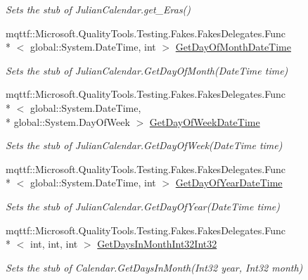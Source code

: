 \begin{DoxyCompactItemize}
\begin{DoxyCompactList}\small\item\em Sets the stub of Julian\-Calendar.\-get\-\_\-\-Eras()\end{DoxyCompactList}\item 
mqttf\-::\-Microsoft.\-Quality\-Tools.\-Testing.\-Fakes.\-Fakes\-Delegates.\-Func\\*
$<$ global\-::\-System.\-Date\-Time, int $>$ \hyperlink{class_system_1_1_globalization_1_1_fakes_1_1_stub_julian_calendar_a74f8b04f919d5bd98d2880a0bebac470}{Get\-Day\-Of\-Month\-Date\-Time}
\begin{DoxyCompactList}\small\item\em Sets the stub of Julian\-Calendar.\-Get\-Day\-Of\-Month(\-Date\-Time time)\end{DoxyCompactList}\item 
mqttf\-::\-Microsoft.\-Quality\-Tools.\-Testing.\-Fakes.\-Fakes\-Delegates.\-Func\\*
$<$ global\-::\-System.\-Date\-Time, \\*
global\-::\-System.\-Day\-Of\-Week $>$ \hyperlink{class_system_1_1_globalization_1_1_fakes_1_1_stub_julian_calendar_a6789f7bd712a9c2485cc8df1e5c92caa}{Get\-Day\-Of\-Week\-Date\-Time}
\begin{DoxyCompactList}\small\item\em Sets the stub of Julian\-Calendar.\-Get\-Day\-Of\-Week(\-Date\-Time time)\end{DoxyCompactList}\item 
mqttf\-::\-Microsoft.\-Quality\-Tools.\-Testing.\-Fakes.\-Fakes\-Delegates.\-Func\\*
$<$ global\-::\-System.\-Date\-Time, int $>$ \hyperlink{class_system_1_1_globalization_1_1_fakes_1_1_stub_julian_calendar_a5a3f102ebb1185c7887758fd3be43321}{Get\-Day\-Of\-Year\-Date\-Time}
\begin{DoxyCompactList}\small\item\em Sets the stub of Julian\-Calendar.\-Get\-Day\-Of\-Year(\-Date\-Time time)\end{DoxyCompactList}\item 
mqttf\-::\-Microsoft.\-Quality\-Tools.\-Testing.\-Fakes.\-Fakes\-Delegates.\-Func\\*
$<$ int, int, int $>$ \hyperlink{class_system_1_1_globalization_1_1_fakes_1_1_stub_julian_calendar_a130fcfbf42da71b4e86b65d844c65643}{Get\-Days\-In\-Month\-Int32\-Int32}
\begin{DoxyCompactList}\small\item\em Sets the stub of Calendar.\-Get\-Days\-In\-Month(\-Int32 year, Int32 month)\end{DoxyCompactList}\item 

\end{DoxyCompactItemize}
